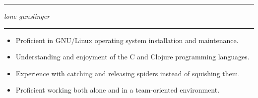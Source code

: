 \documentclass[a4paper, 12pt]{article}
\begin{document}
\begin{flushleft}
\noindent\rule{\textwidth}{0.4pt}
\end{flushleft}
\begin{flushleft}
\newline
\textit{lone gunslinger}
\end{flushleft}
\begin{flushleft}
\noindent\rule{\textwidth}{0.4pt}
\end{flushleft}
\begin{flushleft}
\begin{multicols}{2}
\begin{itemize}
\item Proficient in GNU/Linux operating system installation and maintenance.
\item Understanding and enjoyment of the C and Clojure programming languages.
\item Experience with catching and releasing spiders instead of squishing them.
\item Proficient working both alone and in a team-oriented environment.
\end{itemize}
\end{multicols}
\end{flushleft}
\end{document}
